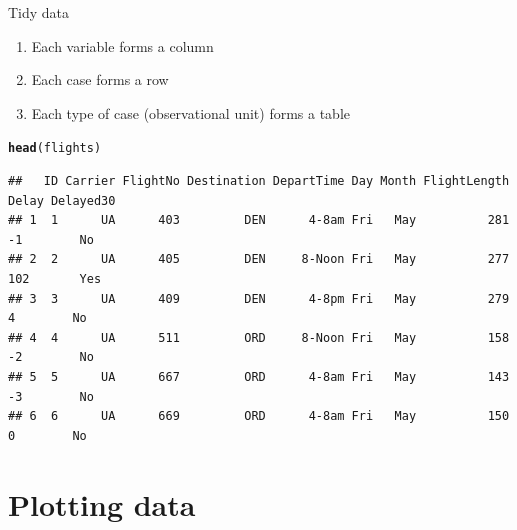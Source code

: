 \documentclass[10pt]{beamer}\usepackage[]{graphicx}\usepackage[]{color}
\makeatletter
\newcommand{\hlstd}[1]{\textcolor[rgb]{0.345,0.345,0.345}{#1}}%
\newcommand{\hlkwd}[1]{\textcolor[rgb]{0.737,0.353,0.396}{\textbf{#1}}}%
\newenvironment{kframe}{%
 \def\at@end@of@kframe{}%
 \ifinner\ifhmode%
  \def\at@end@of@kframe{\end{minipage}}%
  \begin{minipage}{\columnwidth}%
 \fi\fi%
 \def\FrameCommand##1{\hskip\@totalleftmargin \hskip-\fboxsep
 \colorbox{shadecolor}{##1}\hskip-\fboxsep
     \hskip-\linewidth \hskip-\@totalleftmargin \hskip\columnwidth}%
 \MakeFramed {\advance\hsize-\width
   \@totalleftmargin\z@ \linewidth\hsize
   \@setminipage}}%
 {\par\unskip\endMakeFramed%
 \at@end@of@kframe}
\newenvironment{knitrout}{}{} %
\makeatother
\begin{document}
\begin{frame}[fragile]{Tidy data}

\begin{enumerate}
\item Each variable forms a column
\item Each case forms a row
\item Each type of case (observational unit) forms a table
\end{enumerate}

\begin{knitrout}\scriptsize
{}\color{fgcolor}\begin{kframe}
\begin{alltt}
\hlkwd{head}\hlstd{(flights)}
\end{alltt}
\begin{verbatim}
##   ID Carrier FlightNo Destination DepartTime Day Month FlightLength Delay Delayed30
## 1  1      UA      403         DEN      4-8am Fri   May          281    -1        No
## 2  2      UA      405         DEN     8-Noon Fri   May          277   102       Yes
## 3  3      UA      409         DEN      4-8pm Fri   May          279     4        No
## 4  4      UA      511         ORD     8-Noon Fri   May          158    -2        No
## 5  5      UA      667         ORD      4-8am Fri   May          143    -3        No
## 6  6      UA      669         ORD      4-8am Fri   May          150     0        No
\end{verbatim}
\end{kframe}
\end{knitrout}

\end{frame}

\section{Plotting data}
\end{document}
